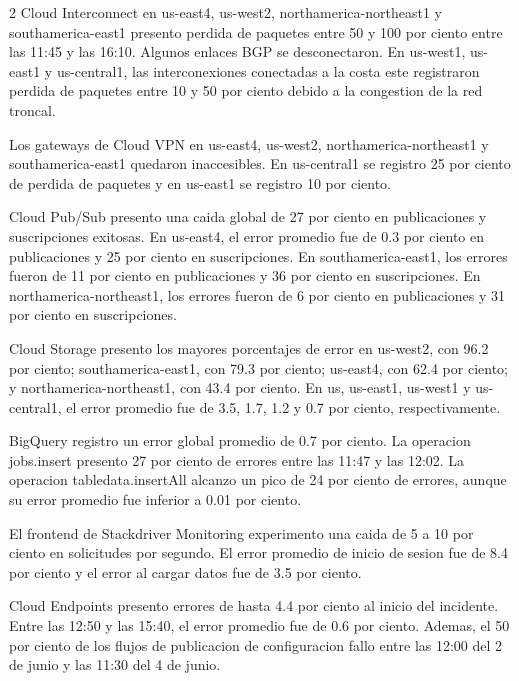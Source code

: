 \documentclass[10pt]{article}
\begin{document}
\begin{multicols}{2}
Cloud Interconnect en us-east4, us-west2, northamerica-northeast1 y southamerica-east1
presento perdida de paquetes entre 50 y 100 por ciento entre las 11:45 y las 16:10. Algunos
enlaces BGP se desconectaron. En us-west1, us-east1 y us-central1, las interconexiones
conectadas a la costa este registraron perdida de paquetes entre 10 y 50 por ciento debido a
la congestion de la red troncal. \cite{googlecloud19009}

Los gateways de Cloud VPN en us-east4, us-west2, northamerica-northeast1 y
southamerica-east1 quedaron inaccesibles. En us-central1 se registro 25 por ciento de perdida
de paquetes y en us-east1 se registro 10 por ciento. \cite{googlecloud19009}

Cloud Pub/Sub presento una caida global de 27 por ciento en publicaciones y suscripciones
exitosas. En us-east4, el error promedio fue de 0.3 por ciento en publicaciones y 25 por
ciento en suscripciones. En southamerica-east1, los errores fueron de 11 por ciento en
publicaciones y 36 por ciento en suscripciones. En northamerica-northeast1, los errores
fueron de 6 por ciento en publicaciones y 31 por ciento en suscripciones. \cite{googlecloud19009}

Cloud Storage presento los mayores porcentajes de error en us-west2, con 96.2 por ciento;
southamerica-east1, con 79.3 por ciento; us-east4, con 62.4 por ciento; y
northamerica-northeast1, con 43.4 por ciento. En us, us-east1, us-west1 y us-central1, el
error promedio fue de 3.5, 1.7, 1.2 y 0.7 por ciento, respectivamente. \cite{googlecloud19009}

BigQuery registro un error global promedio de 0.7 por ciento. La operacion jobs.insert
presento 27 por ciento de errores entre las 11:47 y las 12:02. La operacion
tabledata.insertAll alcanzo un pico de 24 por ciento de errores, aunque su error promedio fue
inferior a 0.01 por ciento. \cite{googlecloud19009}

El frontend de Stackdriver Monitoring experimento una caida de 5 a 10 por ciento en
solicitudes por segundo. El error promedio de inicio de sesion fue de 8.4 por ciento y el
error al cargar datos fue de 3.5 por ciento. \cite{googlecloud19009}

Cloud Endpoints presento errores de hasta 4.4 por ciento al inicio del incidente. Entre las
12:50 y las 15:40, el error promedio fue de 0.6 por ciento. Ademas, el 50 por ciento de los
flujos de publicacion de configuracion fallo entre las 12:00 del 2 de junio y las 11:30 del
4 de junio. \cite{googlecloud19009}


\end{multicols}
\end{document}
